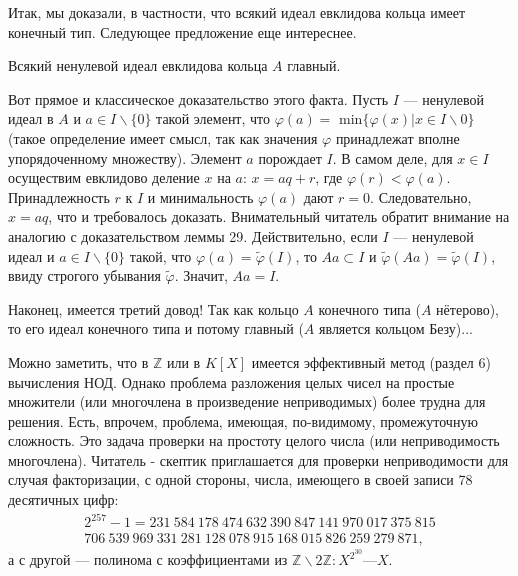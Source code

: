 Итак, мы доказали, в частности, что всякий идеал евклидова кольца имеет конечный тип. Следующее предложение еще интереснее.

\begin{predl}
\hspace*{15pt}Всякий ненулевой идеал евклидова кольца $A$ главный.
\end{predl}

\begin{myproof}
Вот прямое и классическое доказательство этого факта. Пусть 
$I$ — ненулевой идеал в $A$ и $a \in I \backslash \{0\}$ такой элемент, что 
$\varphi(a) =$ min$\{\varphi(x) | x \in I \backslash 0\}$ (такое определение имеет смысл, так 
как значения $\varphi$ принадлежат вполне упорядоченному множеству). 
Элемент $a$ порождает $I$. В самом деле, для $x \in I$ осуществим  
евклидово деление $x$ на $a$: $x = aq + r$, где $\varphi(r) < \varphi(a)$. Принадлежность $r$ 
к $I$ и минимальность $\varphi(a)$ дают $r = 0$. Следовательно, $x = aq$, что 
и требовалось доказать.\newline 
Внимательный читатель обратит внимание на аналогию с  
доказательством леммы 29. Действительно, если $I$ — ненулевой идеал и 
$ a \in I\backslash \{0\}$ такой, что $\varphi(a) = \tilde{\varphi}(I)$, то $Aa \subset I$ и $\tilde{\varphi}(Aa) = \tilde{\varphi}(I)$, ввиду 
 строгого убывания $\tilde{\varphi}$. Значит, $Aa = I$.\newline
\newpage


\noindent Наконец, имеется третий довод! Так как кольцо $A$ конечного  
типа ($A$ нётерово), то его идеал конечного типа и потому главный 
($A$ является кольцом Безу)... 
\end{myproof}

\begin{mynotice}
Можно заметить, что в $\mathbb{Z}$ или в $K[X]$ имеется  
эффективный метод (раздел 6) вычисления НОД. Однако  
проблема разложения целых чисел на простые множители (или  
многочлена в произведение неприводимых) более трудна для решения. 
Есть, впрочем, проблема, имеющая, по-видимому,  
промежуточную сложность. Это задача проверки на простоту целого числа 
(или неприводимость многочлена). Читатель - скептик  
приглашается для проверки неприводимости для случая факторизации, 
с одной стороны, числа, имеющего в своей записи 78 десятичных 
цифр:
\begin{multline*}
2^{257} - 1 = 231\: 584\: 178\: 474\: 632\: 390\: 847\: 141\: 970\: 017\: 375\: 815\\ 
706\: 539\: 969\: 331\: 281\: 128\: 078\: 915\: 168\: 015\: 826\: 259\: 279\: 871,
\end{multline*} 
а с другой — полинома с коэффициентами из $\mathbb{Z}\backslash2\mathbb{Z} : X^{2^{30}} — X$. 
\end{mynotice}
\setcounter{section}{3}

